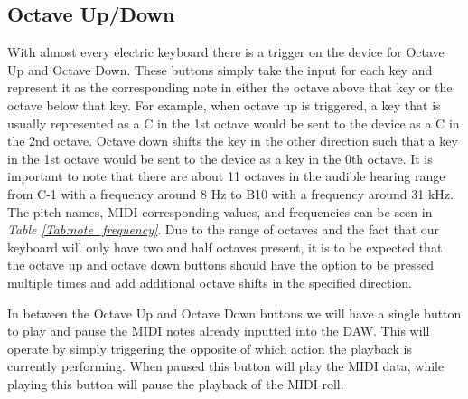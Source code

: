 \subsection{Octave Up/Down}

With almost every electric keyboard there is a trigger on the device for Octave Up and Octave Down. These buttons simply take the input for each key and represent it as the corresponding note in either the octave above that key or the octave below that key. For example, when octave up is triggered, a key that is usually represented as a C in the 1st octave would be sent to the device as a C in the 2nd octave. Octave down shifts the key in the other direction such that a key in the 1st octave would be sent to the device as a key in the 0th octave. It is important to note that there are about 11 octaves in the audible hearing range from C-1 with a frequency around 8 Hz to B10 with a frequency around 31 kHz. The pitch names, MIDI corresponding values, and frequencies can be seen in \textit{Table \ref{Tab:note_frequency}}. Due to the range of octaves and the fact that our keyboard will only have two and half octaves present, it is to be expected that the octave up and octave down buttons should have the option to be pressed multiple times and add additional octave shifts in the specified direction.

\begin{table}[]
  \centering
  \caption{The tabularized relationship between MIDI values and their tonal frequency}
  \label{Tab:note_frequency}
\end{table}

In between the Octave Up and Octave Down buttons we will have a single button to play and pause the MIDI notes already inputted into the DAW. This will operate by simply triggering the opposite of which action the playback is currently performing. When paused this button will play the MIDI data, while playing this button will pause the playback of the MIDI roll.

